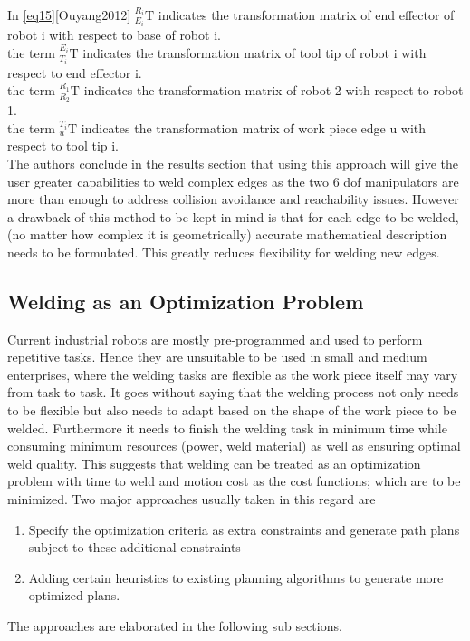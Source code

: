 In \eqref{eq15}[Ouyang2012] ${_{E_{i}}^{R_{i}}\textrm{T}} $ indicates the transformation matrix of end effector of robot i with respect to base of robot i. \\
the term ${_{T_{i}}^{E_{i}}\textrm{T}} $ indicates the transformation matrix of tool tip of robot i with respect to end effector i. \\ 
the term ${_{R_{2}}^{R_{1}}\textrm{T}} $ indicates the transformation matrix of robot 2 with respect to robot 1. \\ 
the term ${_{u}^{T_{i}}\textrm{T}} $ indicates the transformation matrix of work piece edge u with respect to tool tip i.\\
The authors conclude in the results section that using this approach will give the user greater capabilities to weld complex edges as the two 6 dof manipulators are more than enough to address collision avoidance and reachability issues. However a drawback of this method to be kept in mind is that for each edge to be welded, (no matter how complex it is geometrically) accurate mathematical description needs to be formulated. This greatly reduces flexibility for welding new edges. 

\newpage
\subsection{Welding as an Optimization Problem}
Current industrial robots are mostly pre-programmed and used to perform repetitive tasks. Hence they are unsuitable to be used in small and medium enterprises, where the welding tasks are flexible as the work piece itself may vary from task to task. It goes without saying that the welding process not only needs to be flexible but also needs to adapt based on the shape of the work piece to be welded. Furthermore it needs to finish the welding task in minimum time while consuming minimum resources (power, weld material) as well as ensuring optimal weld quality. This suggests that welding can be treated as an optimization problem with time to weld and motion cost as the cost functions; which are to be minimized. Two major approaches usually taken in this regard are 
\begin{enumerate}
\item Specify the optimization criteria as extra constraints and generate path plans subject to these additional constraints
\item Adding certain heuristics to existing planning algorithms to generate more optimized plans.
\end{enumerate}
The approaches are elaborated in the following sub sections.
